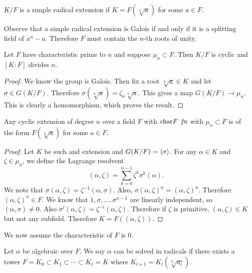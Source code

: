 \message{ !name(notes.tex)}\documentclass[10pt, twoside]{article}
\begin{document}
        \begin{defn}
            $K/F$ is a simple radical extension if $K = F(\sqrt[n]{a})$ for some $a \in F$.
        \end{defn}

        Observe that a simple radical extension is Galois if and only if it is a splitting field of $x^n-a$. Therefore $F$ must contain the $n$-th roots of unity.

        \begin{prop}
            Let $F$ have characteristic prime to $n$ and suppose $\mu_n \subset F$. Then $K/F$ is cyclic and $[K:F]$ divides $n$.
            \begin{proof}
                We know the group is Galois. Then fix a root $\sqrt[n]{a} \in K$ and let $\sigma \in G(K/F)$. Therefore $\sigma(\sqrt[n]{a}) = \zeta_{\sigma}\sqrt[n]{a}$. This gives a map $G(K/F) \to \mu_n$. This is clearly a homomorphism, which proves the result.
            \end{proof}
        \end{prop}

        \begin{prop}
            Any cyclic extension of degree $n$ over a field $F$ with $\mathrm{char} F \not\vert n$ with $\mu_n \subset F$ is of the form $F(\sqrt[n]{a})$ for some $a \in F$.
            \begin{proof}
                Let $K$ be such and extension and $G(K/F) = \langle\sigma\rangle$. For any $\alpha \in K$ and $\zeta \in \mu_n$, we define the Lagrange resolvent \[(\alpha, \zeta) = \sum_{k=0}^{n-1} \zeta^k \sigma^k(\alpha). \] We note that $\sigma(\alpha, \zeta) = \zeta^{-1}(\alpha, \sigma)$. Also, $\sigma (\alpha, \zeta)^n = (\alpha, \zeta)^n$. Therefore $(\alpha, \zeta)^n \in F$. We know that $1, \sigma, \ldots, \sigma^{n-1}$ are linearly independent, so $(\alpha, \sigma) \neq 0$. Also $\sigma^i(\alpha, \zeta) = \zeta^{-i}(\alpha, \zeta)$. Therefore if $\zeta$ is primitive, $(\alpha, \zeta) \in K$ but not any subfield. Therefore $K = F((\alpha, \zeta))$.
            \end{proof}
        \end{prop}

        We now assume the characteristic of $F$ is $0$.

        \begin{defn}
            Let $\alpha$ be algebraic over $F$. We say $\alpha$ can be solved in radicals if there exists a tower $F = K_0 \subset K_1 \subset \cdots \subset K_r = K$ where $K_{i+1}=K_i(\sqrt[n_i]{a_i})$.
        \end{defn}
        
\end{document}
